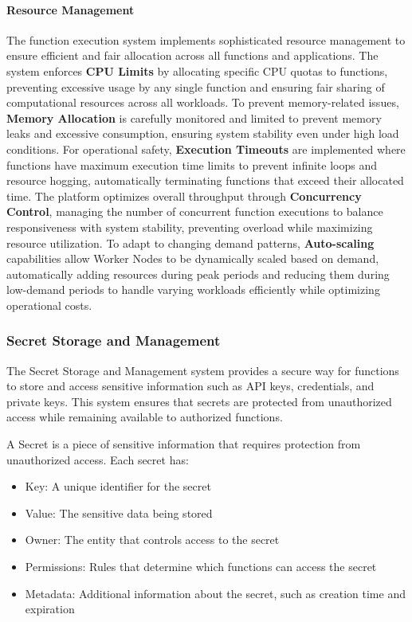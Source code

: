 \documentclass[12pt,a4paper]{article}
\begin{document}
\paragraph{Resource Management}
The function execution system implements sophisticated resource management to ensure efficient and fair allocation across all functions and applications. The system enforces \textbf{CPU Limits} by allocating specific CPU quotas to functions, preventing excessive usage by any single function and ensuring fair sharing of computational resources across all workloads. To prevent memory-related issues, \textbf{Memory Allocation} is carefully monitored and limited to prevent memory leaks and excessive consumption, ensuring system stability even under high load conditions. For operational safety, \textbf{Execution Timeouts} are implemented where functions have maximum execution time limits to prevent infinite loops and resource hogging, automatically terminating functions that exceed their allocated time. The platform optimizes overall throughput through \textbf{Concurrency Control}, managing the number of concurrent function executions to balance responsiveness with system stability, preventing overload while maximizing resource utilization. To adapt to changing demand patterns, \textbf{Auto-scaling} capabilities allow Worker Nodes to be dynamically scaled based on demand, automatically adding resources during peak periods and reducing them during low-demand periods to handle varying workloads efficiently while optimizing operational costs.

\subsubsection{Secret Storage and Management}
\label{subsubsec:secret-storage}

The Secret Storage and Management system provides a secure way for functions to store and access sensitive information such as API keys, credentials, and private keys. This system ensures that secrets are protected from unauthorized access while remaining available to authorized functions.



\begin{definition}[Secret]
A Secret is a piece of sensitive information that requires protection from unauthorized access. Each secret has:
\begin{itemize}
    \item Key: A unique identifier for the secret
    \item Value: The sensitive data being stored
    \item Owner: The entity that controls access to the secret
    \item Permissions: Rules that determine which functions can access the secret
    \item Metadata: Additional information about the secret, such as creation time and expiration
\end{itemize}
\end{definition}
\end{document}
